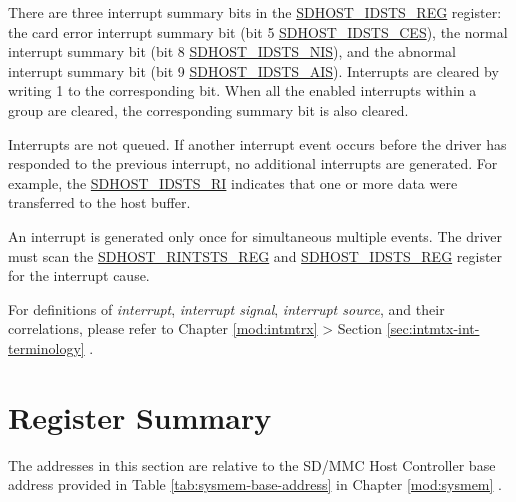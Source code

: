 \documentclass[main\_\_EN.tex]{subfiles}
\begin{document}
There are three interrupt summary bits in the \hyperref[regdesc:SDHOSTIDSTSREG]{SDHOST\_IDSTS\_REG} register: the card error interrupt summary bit (bit 5 \hyperref[fielddesc:SDHOSTIDSTSCES]{SDHOST\_IDSTS\_CES}), the normal interrupt summary bit (bit 8 \hyperref[fielddesc:SDHOSTIDSTSNIS]{SDHOST\_IDSTS\_NIS}), and the abnormal interrupt summary bit (bit 9 \hyperref[fielddesc:SDHOSTIDSTSAIS]{SDHOST\_IDSTS\_AIS}). Interrupts are cleared by writing 1 to the corresponding bit. When all the enabled interrupts within a group are cleared, the corresponding summary bit is also cleared.

Interrupts are not queued. If another interrupt event occurs before the driver has responded to the previous interrupt, no additional interrupts are generated. For example, the \hyperref[fielddesc:SDHOSTIDSTSRI]{SDHOST\_IDSTS\_RI} indicates that one or more data were transferred to the host buffer. 

An interrupt is generated only once for simultaneous multiple events. The driver must scan the \hyperref[regdesc:SDHOSTRINTSTSREG]{SDHOST\_RINTSTS\_REG} and \hyperref[regdesc:SDHOSTIDSTSREG]{SDHOST\_IDSTS\_REG} register for the interrupt cause.

\begin{tiplisting}
For definitions of \textit{interrupt}, \textit{interrupt signal}, \textit{interrupt source}, and their correlations, please refer to Chapter \ref{mod:intmtrx} \textit{} > Section \ref{sec:intmtx-int-terminology} \textit{}.
\end{tiplisting}




\newpage
\hypertarget{sdhost-reg-summ}{}
\section{Register Summary}
\label{sec:sdhost-reg-summ}

The addresses in this section are relative to the SD/MMC Host Controller base address provided in Table \ref{tab:sysmem-base-address} in Chapter \ref{mod:sysmem} \textit{}.
\end{document}
